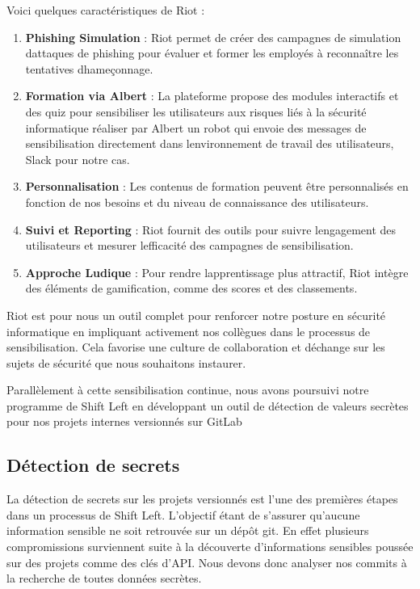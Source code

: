 \documentclass[
  11pt,
  a4paper,
  krantz2,
  11pt,
  oneside]{krantz}
\begin{document}
Voici quelques caractéristiques de Riot :

\begin{enumerate}
\def\labelenumi{\roman{enumi}.}
\item
  \textbf{Phishing Simulation} : Riot permet de créer des campagnes de simulation d\textquotesingle attaques de phishing pour évaluer et former les employés à reconnaître les tentatives d\textquotesingle hameçonnage.
\item
  \textbf{Formation via Albert} : La plateforme propose des modules interactifs et des quiz pour sensibiliser les utilisateurs aux risques liés à la sécurité informatique réaliser par Albert un robot qui envoie des messages de sensibilisation directement dans l\textquotesingle environnement de travail des utilisateurs, Slack pour notre cas.
\item
  \textbf{Personnalisation} : Les contenus de formation peuvent être personnalisés en fonction de nos besoins et du niveau de connaissance des utilisateurs.
\item
  \textbf{Suivi et Reporting} : Riot fournit des outils pour suivre l\textquotesingle engagement des utilisateurs et mesurer l\textquotesingle efficacité des campagnes de sensibilisation.
\item
  \textbf{Approche Ludique} : Pour rendre l\textquotesingle apprentissage plus attractif, Riot intègre des éléments de gamification, comme des scores et des classements.
\end{enumerate}

Riot est pour nous un outil complet pour renforcer notre posture en sécurité informatique en impliquant activement nos collègues dans le processus de sensibilisation. Cela favorise une culture de collaboration et d\textquotesingle échange sur les sujets de sécurité que nous souhaitons instaurer.

Parallèlement à cette sensibilisation continue, nous avons poursuivi notre programme de Shift Left en développant un outil de détection de valeurs secrètes pour nos projets internes versionnés sur GitLab

\subsection{Détection de secrets}\label{duxe9tection-de-secrets}

La détection de secrets sur les projets versionnés est l'une des premières étapes dans un processus de Shift Left. L'objectif étant de s'assurer qu'aucune information sensible ne soit retrouvée sur un dépôt git. En effet plusieurs compromissions surviennent suite à la découverte d'informations sensibles poussée sur des projets comme des clés d'API. Nous devons donc analyser nos commits à la recherche de toutes données secrètes.
\end{document}
